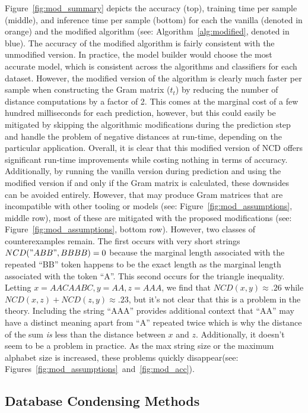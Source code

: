 \documentclass[conference]{IEEEtran}
\begin{document}
Figure~\ref{fig:mod_summary} depicts the accuracy (top), training time per sample (middle), and inference time per sample (bottom) for each the vanilla (denoted in orange) and the modified algorithm (see: Algorithm~\ref{alg:modified}, denoted in blue). 
The accuracy of the modified algorithm is fairly consistent with the unmodified version. 
In practice, the model builder would choose the most accurate model, which is consistent across the algorithms and classifiers for each dataset. 
However, the modified version of the algorithm is clearly much faster per sample when constructing the Gram matrix ($t_t$) by reducing the number of distance computations by a factor of 2. 
This comes at the marginal cost of a few hundred milliseconds for each prediction, however, but this could easily be mitigated by skipping the algorithmic modifications during the prediction step and handle the problem of negative distances at run-time, depending on the particular application. 
Overall, it is clear that this modified version of NCD offers significant run-time improvements while costing nothing in terms of accuracy. 
Additionally, by running the vanilla version during prediction and using the modified version if and only if the Gram matrix is calculated, these downsides can be avoided entirely. 
However, that may produce Gram matrices that are incompatible with other tooling or models (see: Figure~\ref{fig:mod_assumptions}, middle row), most of these are mitigated with the proposed modifications (see: Figure~\ref{fig:mod_assumptions}, bottom row). 
However, two classes of counterexamples remain. 
The first occurs with very short strings
$NCD("ABB", BBBB) =0$ because the marginal length associated with the repeated ``BB'' token happens to be the exact length as the marginal length associated with the token ``A''. 
This second occurs for the triangle inequality. 
Letting $x =AACAABC, y = AA,
z=AAA$, we find that $NCD(x,y) \approx .26$ while $NCD(x,z) + NCD(z,y) \approx .23$, but it's not clear that this is a problem in the theory. Including the string ``AAA'' provides additional context that ``AA'' may have a distinct meaning apart from ``A'' repeated twice which is why the distance of the sum \textit{is} less than the distance between $x$ and $z$. Additionally, it doesn't seem to be a problem in practice. 
As the max string size or the maximum alphabet size is increased, these problems quickly disappear(see: Figures~\ref{fig:mod_assumptions}~and~\ref{fig:mod_acc}).




\subsection{Database Condensing Methods}
\end{document}

